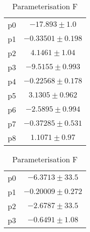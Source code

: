 \begin{table}[h]
	\begin{subtable}{0.49\textwidth}
		\caption{Parameterisation D}
		\centering
		\begin{tabular}{|c|c|}
			\centering
			p0 & $-17.893 \pm 1.0$ \\
			p1 & $-0.33501 \pm 0.198$ \\
			p2 & $4.1461 \pm 1.04$ \\
			p3 & $-9.5155 \pm 0.993$ \\
			p4 & $-0.22568 \pm 0.178$ \\
			p5 & $3.1305 \pm 0.962$ \\
			p6 & $-2.5895 \pm 0.994$ \\
			p7 & $-0.37285 \pm 0.531$ \\
			p8 & $1.1071 \pm 0.97$ \\
		\end{tabular}
	\end{subtable}
	\begin{subtable}{0.49\textwidth}
		\caption{Parameterisation F}
		\centering
		\begin{tabular}{|c|c|}
			\centering
			p0 & $-6.3713 \pm 33.5$ \\
			p1 & $-0.20009 \pm 0.272$ \\
			p2 & $-2.6787 \pm 33.5$ \\
			p3 & $-0.6491 \pm 1.08$ \\
		\end{tabular}
	\end{subtable}
\end{table}
\newpage